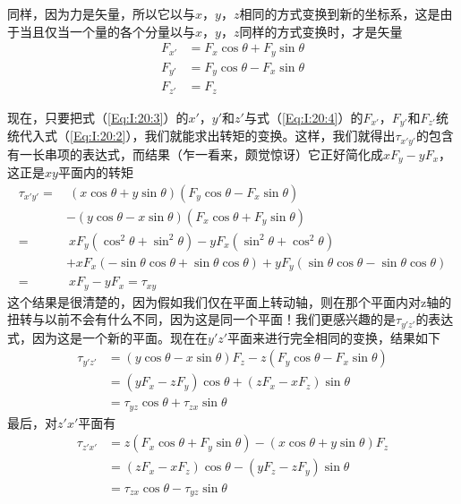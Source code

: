 同样，因为力是矢量，所以它以与$x$，$y$，$z$相同的方式变换到新的坐标系，这是由于当且仅当一个量的各个分量以与$x$，$y$，$z$同样的方式变换时，才是矢量
\begin{equation}
    \label{Eq:I:20:4}
    \begin{aligned}
        F_{x'} &= F_x \cos \theta + F_y \sin \theta \\
        F_{y'} &= F_y \cos \theta - F_x \sin \theta \\
        F_{z'} &= F_z
    \end{aligned}
\end{equation}

现在，只要把式（\ref{Eq:I:20:3}）的$x'$，$y'$和$z'$与式（\ref{Eq:I:20:4}）的$F_{x'}$，$F_{y'}$和$F_{z'}$统统代入式（\ref{Eq:I:20:2}），我们就能求出转矩的变换。这样，我们就得出$\tau_{x'y'}$的包含有一长串项的表达式，而结果（乍一看来，颇觉惊讶）它正好简化成$xF_y-yF_x$，这正是$xy$平面内的转矩
\begin{equation}
    \label{Eq:I:20:5}
    \begin{aligned}
        \tau_{x'y'} = &~(x\cos \theta + y \sin \theta)(F_y \cos \theta - F_x \sin \theta) \\
        &- (y\cos \theta - x \sin \theta)(F_x \cos \theta + F_y \sin \theta) \\
        = &~xF_y(\cos^2 \theta + \sin^2 \theta) - yF_x(\sin^2 \theta + \cos^2 \theta) \\
        &+ xF_x(-\sin \theta \cos \theta + \sin \theta \cos \theta) + yF_y(\sin \theta \cos \theta - \sin \theta \cos \theta) \\
        = &~xF_y - yF_x = \tau_{xy}
    \end{aligned}
\end{equation}
这个结果是很清楚的，因为假如我们仅在平面上转动轴，则在那个平面内对z轴的扭转与以前不会有什么不同，因为这是同一个平面！我们更感兴趣的是$\tau_{y'z'}$的表达式，因为这是一个新的平面。现在在$y'z'$平面来进行完全相同的变换，结果如下
\begin{equation}
    \label{Eq:I:20:6}
    \begin{aligned}
        \tau_{y'z'} &= (y \cos \theta - x \sin \theta)F_z - z(F_y \cos \theta - F_x \sin \theta) \\
        &= (yF_x - zF_y)\cos \theta + (zF_x - xF_z)\sin \theta \\
        &= \tau_{yz} \cos \theta + \tau_{zx} \sin \theta
    \end{aligned}
\end{equation}
最后，对$z'x'$平面有
\begin{equation}
    \label{Eq:I:20:7}
    \begin{aligned}
        \tau_{z'x'}&=z(F_x\cos\theta+F_y\sin\theta)-(x\cos\theta+y\sin\theta)F_z \\
        &=(zF_x-xF_z)\cos\theta-(yF_z-zF_y)\sin\theta \\
        &=\tau_{zx}\cos\theta-\tau_{yz}\sin\theta
    \end{aligned}
\end{equation}

